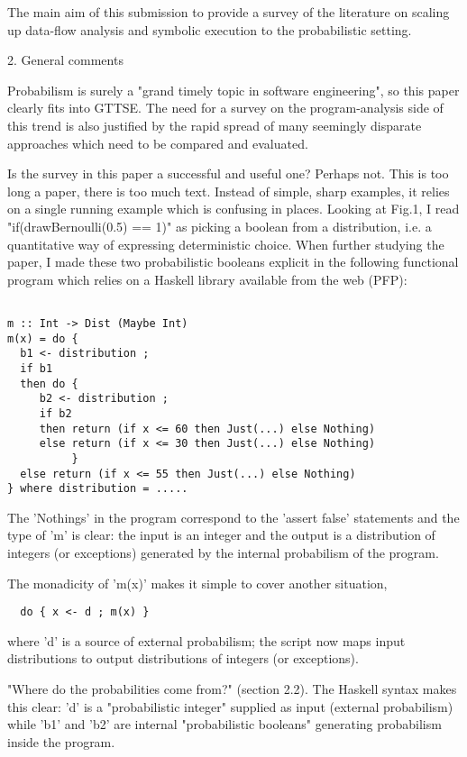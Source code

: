 \documentclass[12pm]{article}
\begin{document}
The main aim of this submission to provide a survey of the literature
on scaling up data-flow analysis and symbolic execution to the
probabilistic setting.

2. General comments

Probabilism is surely a "grand timely topic in software engineering",
so this paper clearly fits into GTTSE. The need for a survey on
the program-analysis side of this trend is also justified by the
rapid spread of many seemingly disparate approaches which need
to be compared and evaluated.

Is the survey in this paper a successful and useful one? Perhaps
not. This is too long a paper, there is too much text. Instead
of simple, sharp examples, it relies on a single running example
which is confusing in places. Looking at Fig.1, I read
"if(drawBernoulli(0.5) == 1)" as picking a boolean from a distribution,
i.e. a quantitative way of expressing deterministic choice.
When further studying the paper, I made these two probabilistic
booleans explicit in the following functional program which relies
on a Haskell library available from the web (PFP):

\begin{lstlisting}

m :: Int -> Dist (Maybe Int)
m(x) = do {
  b1 <- distribution ;
  if b1
  then do {
     b2 <- distribution ;
     if b2
     then return (if x <= 60 then Just(...) else Nothing)
     else return (if x <= 30 then Just(...) else Nothing)
          }
  else return (if x <= 55 then Just(...) else Nothing)
} where distribution = .....

\end{lstlisting}

The 'Nothings' in the program correspond to the 'assert false' statements
and the type of 'm' is clear: the input is an integer and the output is a
distribution of integers (or exceptions) generated by the internal probabilism
of the program.

The monadicity of 'm(x)' makes it simple to cover another situation,

\begin{lstlisting}
  do { x <- d ; m(x) }
\end{lstlisting}

where 'd' is a source of external probabilism; the script now maps input
distributions to output distributions of integers (or exceptions).

"Where do the probabilities come from?" (section 2.2). The Haskell
syntax makes this clear: 'd' is a "probabilistic integer" supplied
as input (external probabilism) while 'b1' and 'b2' are internal
"probabilistic booleans" generating probabilism inside the program.
\end{document}
